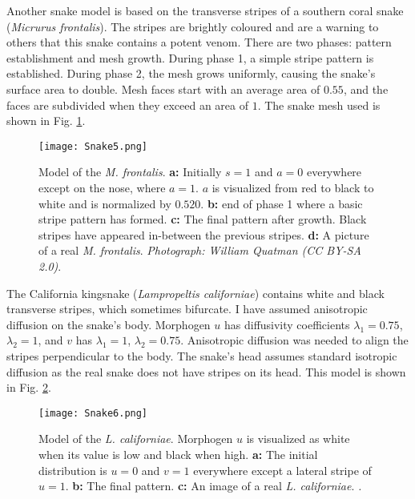 \newpage
Another snake model is based on the transverse stripes of a southern coral snake (\textit{Micrurus frontalis}). The stripes are brightly coloured and are a warning to others that this snake contains a potent venom. There are two phases: pattern establishment and mesh growth. During phase 1, a simple stripe pattern is established. During phase 2, the mesh grows uniformly, causing the snake's surface area to double. Mesh faces start with an average area of $0.55$, and the faces are subdivided when they exceed an area of $1$. The snake mesh used is shown in Fig. \ref{fig:Snake5}.

\begin{figure}[ht]
	\centering
	\texttt{[image: Snake5.png]}
	\caption[Model of the \textit{M. frontalis}]{Model of the \textit{M. frontalis}. \textbf{a:} Initially $s=1$ and $a=0$ everywhere except on the nose, where $a=1$. $a$ is visualized from red to black to white and is normalized by $0.520$. \textbf{b:} end of phase 1 where a basic stripe pattern has formed. \textbf{c:} The final pattern after growth. Black stripes have appeared in-between the previous stripes. \textbf{d:} A picture of a real \textit{M. frontalis}. \textit{Photograph: William Quatman (CC BY-SA 2.0)}.}
	\label{fig:Snake5}
\end{figure}
\newpage 

The California kingsnake (\textit{Lampropeltis californiae}) contains white and black transverse stripes, which sometimes bifurcate. I have assumed anisotropic diffusion on the snake's body. Morphogen $u$ has diffusivity coefficients $\lambda_{1}=0.75$, $\lambda_{2}=1$, and $v$ has $\lambda_{1}=1$, $\lambda_{2}=0.75$. Anisotropic diffusion was needed to align the stripes perpendicular to the body. The snake's head assumes standard isotropic diffusion as the real snake does not have stripes on its head. This model is shown in Fig. \ref{fig:Snake6}.

\begin{figure}[ht]
	\centering
	\texttt{[image: Snake6.png]}
	\caption[Model of the \textit{L. californiae}]{Model of the \textit{L. californiae}. Morphogen $u$ is visualized as white when its value is low and black when high. \textbf{a:} The initial distribution is $u=0$ and $v=1$ everywhere except a lateral stripe  of $u=1$. \textbf{b:} The final pattern. \textbf{c:} An image of a real \textit{L. californiae}. \textit{.}}
	\label{fig:Snake6}
\end{figure}

